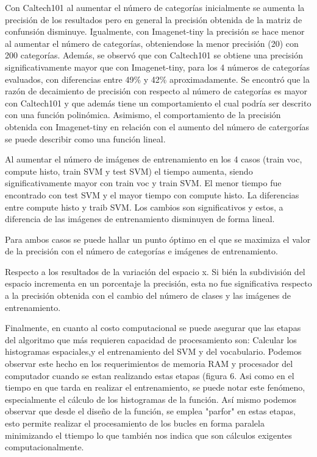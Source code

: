 \documentclass[10pt,twocolumn,letterpaper]{article}
\begin{document}
Con Caltech101 al aumentar el número de categorías inicialmente se aumenta la precisión de los resultados pero en general la precisión obtenida de la matriz de confunsión disminuye. Igualmente, con Imagenet-tiny la precisión se hace menor al aumentar el número de categorías, obteniendose la menor precisión (20) con 200 categorías. Además, se observó que con Caltech101 se obtiene una precisión significativamente mayor que con Imagenet-tiny, para los 4 números de categorías evaluados, con diferencias entre 49\% y 42\% aproximadamente. Se encontró que la razón de decaimiento de precisión con respecto al número de categorías es mayor con Caltech101 y que además tiene un comportamiento el cual podría ser descrito con una función polinómica. Asimismo, el comportamiento de la precisión obtenida con Imagenet-tiny en relación con  el aumento del número de catergorías se puede describir como una función lineal. 


Al aumentar el número de imágenes de entrenamiento en los 4 casos (train voc, compute histo, train SVM y test SVM) el tiempo aumenta, siendo significativamente mayor con train voc y train SVM. El menor tiempo fue encontrado con test SVM y el mayor tiempo con compute histo. La diferencias entre  compute histo y traib SVM. Los cambios son significativos y estos, a diferencia de las imágenes de entrenamiento disminuyen de forma lineal.

Para ambos casos se puede hallar un punto óptimo en el que se maximiza el valor de la precisión con el número de categorías e imágenes de entrenamiento.

Respecto a los resultados de la variación del espacio x. Si bién la subdivisión del espacio incrementa en un porcentaje la precisión, esta no fue significativa respecto a la precisión obtenida con el cambio del número de clases y las imágenes de entrenamiento. 

Finalmente, en cuanto al costo computacional se puede asegurar que las etapas del algoritmo que más requieren capacidad de procesamiento son: Calcular los histogramas espaciales,y el entrenamiento del SVM y del vocabulario. Podemos observar este hecho en los requerimientos de memoria RAM y procesador del computador cuando se estan realizando estas etapas (figura 6. Asi como en el tiempo en que tarda en realizar el entrenamiento, se puede notar este fenómeno, especialmente el cálculo de los histogramas de la función. Así mismo podemos observar que desde el diseño de la función, se emplea "parfor" en estas etapas, esto permite realizar el procesamiento de los bucles en forma paralela minimizando el ttiempo lo que también nos indica que son cálculos exigentes computacionalmente.
\end{document}
